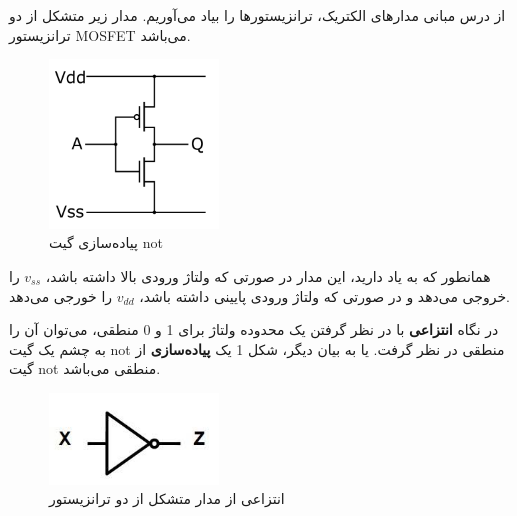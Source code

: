 \begin{flushright}
                      از درس مبانی‌ مدارهای الکتریک، ترانزیستورها را بیاد می‌آوریم.
                      مدار زیر متشکل از دو ترانزیستور MOSFET می‌باشد.

                      \begin{figure}[h]
                          \centering
                          \includegraphics[width= 0.4\textwidth]{source/not-gate-imp}
                          \caption{پیاده‌سازی گیت not}
                          \label{fig:not-gate-imp}

                      \end{figure}

                      همانطور که به یاد دارید، این مدار در صورتی که ولتاژ ورودی بالا داشته باشد،
                      $v_{ss}$
                      را خروجی می‌دهد و در صورتی که ولتاژ ورودی پایینی داشته باشد،
                      $v_{dd}$
                      را خورجی می‌دهد.

                      در نگاه \textbf{انتزاعی} با در نظر گرفتن یک محدوده ولتاژ برای 1 و 0 منطقی، می‌توان آن را به چشم یک گیت not منطقی در نظر گرفت.
                      یا به بیان دیگر، شکل 1 یک \textbf{پیاده‌سازی} از گیت not منطقی می‌باشد.

                      \begin{figure}[h]
                          \centering
                          \includegraphics[width= 0.4\textwidth]{source/not-gate-abs}
                          \caption{انتزاعی از مدار متشکل از دو ترانزیستور}
                          \label{fig:not-gate-abs}
                      \end{figure}

\end{flushright}

